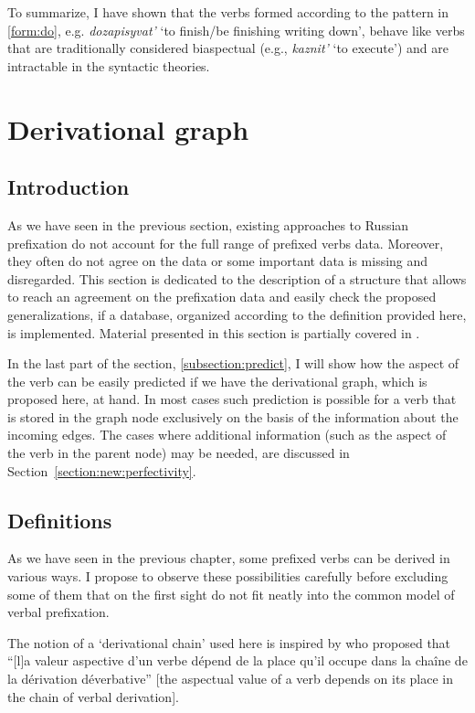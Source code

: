 To summarize, I have shown that the verbs formed according to the pattern in \ref{form:do}, e.g. \textit{dozapisyvat'} `to finish/be finishing writing down', behave like verbs that are traditionally considered biaspectual (e.g., \textit{kaznit'} `to execute') and are intractable in the syntactic theories.


\section{Derivational graph}\label{section:graph}
\subsection{Introduction}
As we have seen in the previous section, existing approaches to Russian prefixation do not account for the full range of prefixed verbs data. Moreover, they often do not agree on the data or some important data is missing and disregarded. This section is dedicated to the description of a structure that allows to reach an agreement on the prefixation data and easily check the proposed generalizations, if a database, organized according to the definition provided here, is implemented. Material presented in this section is partially covered in \citet{ZinovaFilip:14b}.

In the last part of the section, \ref{subsection:predict}, I will show how the aspect of the verb can be easily predicted if we have the derivational graph, which is proposed here, at hand. In most cases such prediction is possible for a verb that is stored in the graph node exclusively on the basis of the information about the incoming edges. The cases where additional information (such as the aspect of the verb in the parent node) may be needed, are discussed in Section~\ref{section:new:perfectivity}.

\subsection{Definitions}\label{section:chains:definition}
As we have seen in the previous chapter, some prefixed verbs can be derived in various ways. I propose to observe these possibilities carefully before excluding some of them that on the first sight do not fit neatly into the common model of verbal prefixation.

The notion of a `derivational chain' used here is inspired by \citet{Karcevski:27} who proposed that ``[l]a valeur aspective d'un verbe d\'{e}pend de la place qu'il occupe dans la cha\^{i}ne de la d\'{e}rivation d\'{e}verbative'' [the aspectual value of a verb depends on its place in the chain of verbal derivation].

